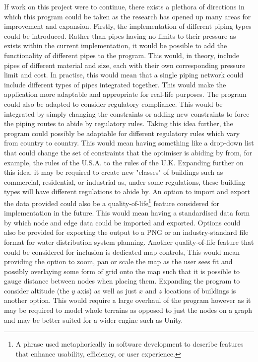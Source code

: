 If work on this project were to continue, there exists a plethora of directions in which this program could be taken as the research has opened up many areas for improvement and expansion. Firstly, the implementation of different piping types could be introduced. Rather than pipes having no limits to their pressure as exists within the current implementation, it would be possible to add the functionality of different pipes to the program. This would, in theory, include pipes of different material and size, each with their own corresponding pressure limit and cost. In practise, this would mean that a single piping network could include different types of pipes integrated together. This would make the application more adaptable and appropriate for real-life purposes.\newline
The program could also be adapted to consider regulatory compliance. This would be integrated by simply changing the constraints or adding new constraints to force the piping routes to abide by regulatory rules. Taking this idea further, the program could possibly be adaptable for different regulatory rules which vary from country to country. This would mean having something like a drop-down list that could change the set of constraints that the optimiser is abiding by from, for example, the rules of the U.S.A. to the rules of the U.K. Expanding further on this idea, it may be required to create new "classes" of buildings such as commercial, residential, or industrial as, under some regulations, these building types will have different regulations to abide by.\newline
An option to import and export the data provided could also be a quality-of-life\footnote{A phrase used metaphorically in software development to describe features that enhance usability, efficiency, or user experience.} feature considered for implementation in the future. This would mean having a standardised data form by which node and edge data could be imported and exported. Options could also be provided  for exporting the output to a PNG or an industry-standard file format for water distribution system planning.\newline
Another quality-of-life feature that could be considered for inclusion is dedicated map controls, This would mean providing the option to zoom, pan or scale the map as the user sees fit and possibly overlaying some form of grid onto the map such that it is possible to gauge distance between nodes when placing them.\newline
Expanding the program to consider altitude (the $y$ axis) as well as just $x$ and $z$ locations of buildings is another option. This would require a large overhaul of the program however as it may be required to model whole terrains as opposed to just the nodes on a graph and may be better suited for a wider engine such as Unity.\newline
